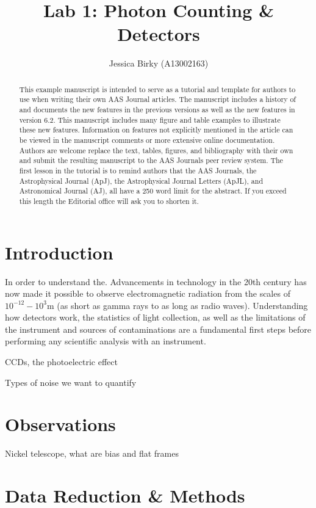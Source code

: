 \documentclass[preprint]{aastex62}
\begin{document}
\title{\sc Lab 1: Photon Counting \& Detectors}
\author{Jessica Birky (A13002163)}

\begin{abstract}
This example manuscript is intended to serve as a tutorial and template for
authors to use when writing their own AAS Journal articles. The manuscript
includes a history of and documents the new features in the
previous versions as well as the new features in version 6.2. This
manuscript includes many figure and table examples to illustrate these new
features.  Information on features not explicitly mentioned in the article
can be viewed in the manuscript comments or more extensive online
documentation. Authors are welcome replace the text, tables, figures, and
bibliography with their own and submit the resulting manuscript to the AAS
Journals peer review system.  The first lesson in the tutorial is to remind
authors that the AAS Journals, the Astrophysical Journal (ApJ), the
Astrophysical Journal Letters (ApJL), and Astronomical Journal (AJ), all
have a 250 word limit for the abstract.  If you exceed this length the
Editorial office will ask you to shorten it.

\end{abstract}
\bigskip

\section{Introduction} 
In order to understand the. Advancements in technology in the 20th century has now made it possible to observe electromagnetic radiation from the scales of $10^{-12}-10^3$m (as short as gamma rays to as long as radio waves). Understanding how detectors work, the statistics of light collection, as well as the limitations of the instrument and sources of contaminations are a fundamental first steps before performing any scientific analysis with an instrument.

CCDs, the photoelectric effect

Types of noise we want to quantify

\section{Observations}
Nickel telescope, what are bias and flat frames


\section{Data Reduction \& Methods}
\end{document}
